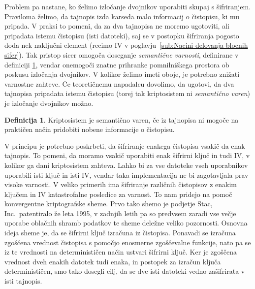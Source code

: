\documentclass[12pt,a4paper,openany,tikz]{book}
\theoremstyle{plain}
\theoremstyle{definition}
\newtheorem{defn}[thm]{Definicija} %
\begin{document}
Problem pa nastane, ko želimo izločanje dvojnikov uporabiti skupaj s šifriranjem. Praviloma želimo, da tajnopis izda karseda malo informacij o čistopisu, ki mu pripada. V praksi to pomeni, da za dva tajnopisa ne moremo ugotoviti, ali pripadata istemu čistopisu (isti datoteki), saj se v postopku šifriranja pogosto doda nek naključni element (recimo \gls{IV} v poglavju~\ref{sub:Nacini delovanja blocnih sifer}). Tak pristop sicer omogoča doseganje \textit{semantične varnosti}, definirane v definiciji \ref{def:semsec}, vendar onemogoči znatne prihranke pomnilniškega prostora ob poskusu izločanja dvojnikov. V kolikor želimo imeti oboje, je potrebno znižati varnostne zahteve. Če teoretičnemu napadalcu dovolimo, da ugotovi, da dva tajnopisa pripadata istemu čistopisu (torej tak kriptosistem ni \textit{semantično varen}) je izločanje dvojnikov možno.

\begin{mdframed}[frametitle={Semantična varnost}]
  \begin{defn}
    Kriptosistem je semantično varen, če iz tajnopisa ni mogoče na praktičen način pridobiti nobene informacije o čistopisu.
    \label{def:semsec}
  \end{defn}
\end{mdframed}

V principu je potrebno poskrbeti, da šifriranje enakega čistopisa vsakič da enak tajnopis. To pomeni, da moramo vsakič uporabiti enak šifrirni ključ in tudi \gls{IV}, v kolikor ga dani kriptosistem zahteva. Lahko bi za vse datoteke vseh uporabnikov uporabili isti ključ in isti \gls{IV}, vendar taka implementacija ne bi zagotavljala prav visoke varnosti. V veliko primerih ima šifriranje različnih čistopisov z enakim ključem in IV katastrofalne posledice za varnost. To nam pridejo na pomoč konvergentne kriptografske sheme. Prvo tako shemo je podjetje Stac, Inc.\ patentiralo že leta 1995, v zadnjih letih pa so predvsem zaradi vse večje uporabe oblačnih shramb podatkov te sheme deležne veliko pozornosti. Osnovna ideja sheme je, da se šifrirni ključ izračuna iz čistopisa. Ponavadi se izračuna zgoščena vrednost čistopisa s pomočjo enosmerne zgoščevalne funkcije, nato pa se iz te vrednosti na determinističen način ustvari šifrirni ključ. Ker je zgoščena vrednost dveh enakih datotek tudi enaka, in postopek za izračun ključa determinističen, smo tako dosegli cilj, da se dve isti datoteki vedno zašifrirata v isti tajnopis.
\end{document}
